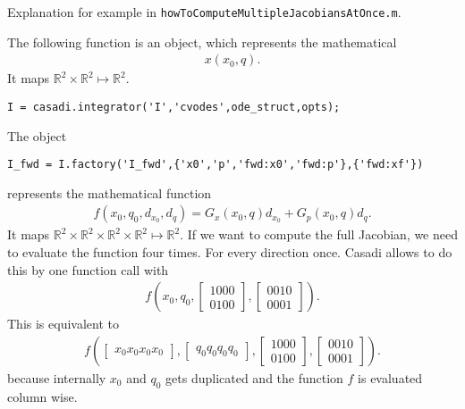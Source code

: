 Explanation for example in \texttt{howToComputeMultipleJacobiansAtOnce.m}.

The following function is an object, which represents the mathematical
\begin{align}
  x(x_0,q).
\end{align}
It maps $\mathbb{R}^2 \times \mathbb{R}^2 \mapsto \mathbb{R}^2$.
\begin{lstlisting}[basicstyle=\small]
  I = casadi.integrator('I','cvodes',ode_struct,opts);
\end{lstlisting}

The object 
\begin{lstlisting}[basicstyle=\small]
  I_fwd = I.factory('I_fwd',{'x0','p','fwd:x0','fwd:p'},{'fwd:xf'}) 
\end{lstlisting}
represents the mathematical function
\begin{align}
  f(x_0,q_0, d_{x_0},d_{q}) = G_x(x_0,q) d_{x_0} + G_p (x_0,q) d_q.
\end{align}
It maps $\mathbb{R}^2 \times \mathbb{R}^2 \times \mathbb{R}^2 \times \mathbb{R}^2\mapsto \mathbb{R}^2$.
If we want to compute the full Jacobian, we need to evaluate the function four times. 
For every direction once. 
Casadi allows to do this by one function call with
\begin{align}
  f(x_0,q_0, \begin{bmatrix} 1 0 0 0  \\ 0 1 0 0 \end{bmatrix},\begin{bmatrix}  0 0 1 0  \\  0 0 0 1 \end{bmatrix}).
\end{align}
This is equivalent to 
\begin{align}
  f(
    \begin{bmatrix}
    x_0  x_0  x_0  x_0
    \end{bmatrix},
    \begin{bmatrix}
    q_0   q_0 q_0 q_0
    \end{bmatrix},
  \begin{bmatrix} 1 0 0 0  \\ 0 1 0 0 \end{bmatrix}
  ,\begin{bmatrix}  0 0 1 0  \\  0 0 0 1 \end{bmatrix}).
\end{align}
because internally $x_0$ and $q_0$ gets duplicated and the function $f$ is evaluated column wise.
